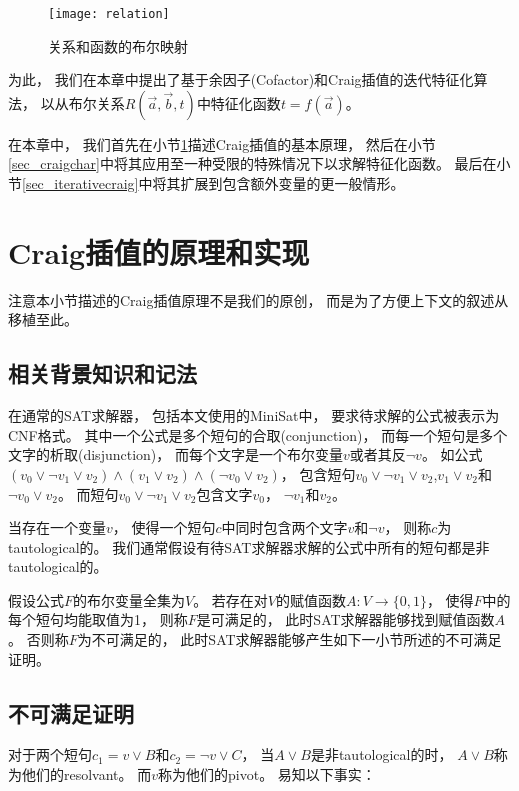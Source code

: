 \begin{figure}[t]
\begin{center}
\texttt{[image: relation]}
\end{center}
\caption{关系和函数的布尔映射}
  \label{fig_relation}
\end{figure}

为此，
我们在本章中提出了基于余因子(Cofactor)和Craig插值的迭代特征化算法，
以从布尔关系$R(\vec{a},\vec{b},t)$中特征化函数$t=f(\vec{a})$。

在本章中，
我们首先在小节\ref{sec_craigimp}描述Craig插值的基本原理，
然后在小节\ref{sec_craigchar}中将其应用至一种受限的特殊情况下以求解特征化函数。
最后在小节\ref{sec_iterativecraig}中将其扩展到包含额外变量的更一般情形。

\section{Craig插值的原理和实现}\label{sec_craigimp}
注意本小节描述的Craig插值原理不是我们的原创，
而是为了方便上下文的叙述从 移植至此。
\subsection{相关背景知识和记法}
在通常的SAT求解器，
包括本文使用的MiniSat中，
要求待求解的公式被表示为CNF格式。
其中一个公式是多个短句的合取(conjunction)，
而每一个短句是多个文字的析取(disjunction)，
而每个文字是一个布尔变量$v$或者其反$\neg v$。
如公式$(v_0\vee\neg v_1\vee v_2)\wedge(v_1\vee v_2)\wedge(\neg v_0\vee v_2)$，
包含短句$v_0\vee\neg v_1\vee v_2$,$v_1\vee v_2$和$\neg v_0\vee v_2$。
而短句$v_0\vee\neg v_1\vee v_2$包含文字$v_0$， $\neg v_1$和$v_2$。

当存在一个变量$v$，
使得一个短句$c$中同时包含两个文字$v$和$\neg v$，
则称$c$为tautological的。
我们通常假设有待SAT求解器求解的公式中所有的短句都是非tautological的。

假设公式$F$的布尔变量全集为$V$。
若存在对$V$的赋值函数$A:V\to \{0,1\}$，
使得$F$中的每个短句均能取值为1，
则称$F$是可满足的，
此时SAT求解器能够找到赋值函数$A$。
否则称$F$为不可满足的，
此时SAT求解器能够产生如下一小节所述的不可满足证明。

\subsection{不可满足证明}
对于两个短句$c_1=v\vee B$和$c_2=\neg v\vee C$，
当$A\vee B$是非tautological的时，
$A\vee B$称为他们的resolvant。
而$v$称为他们的pivot。
易知以下事实：

